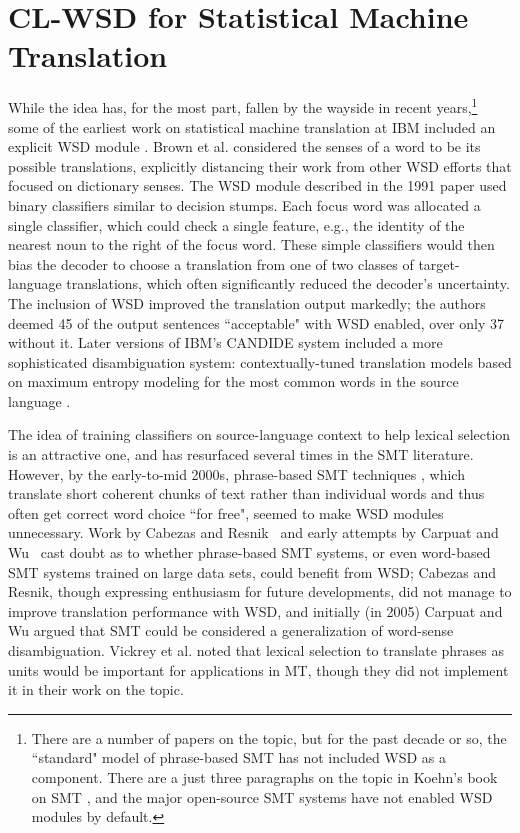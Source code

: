 \section{CL-WSD for Statistical Machine Translation}
While the idea has, for the most part, fallen by the wayside in recent
years,\footnote{There are a number of papers on the topic, but for the past
decade or so, the ``standard" model of phrase-based SMT has not included WSD as
a component. There are a just three paragraphs on the topic in Koehn's book on
SMT \cite[\S 5.3.6]{koehn2010statistical}, and the major open-source SMT
systems have not enabled WSD modules by default.}
some of the earliest work on statistical machine translation at IBM included
an explicit WSD module \cite{Brown91word-sensedisambiguation}.
Brown et al. considered the senses of a word to be its possible translations,
explicitly distancing their work from other WSD efforts that focused on
dictionary senses.
The WSD module described in the 1991 paper used binary classifiers similar to
decision stumps. Each focus word was allocated a single classifier, which could
check a single feature, e.g., the identity of the nearest noun to the right of
the focus word.
These simple classifiers would then bias the decoder to choose a
translation from one of two classes of target-language translations,
which often significantly reduced the decoder's uncertainty. The inclusion of
WSD improved the translation output markedly; the authors deemed 45 of the
output sentences ``acceptable" with WSD enabled, over only 37 without it.
Later versions of IBM's CANDIDE system included a more sophisticated
disambiguation system: contextually-tuned translation models based on
maximum entropy modeling for the most common words in the source language
\cite{Berger:1994:CSM:1075812.1075844}.

The idea of training classifiers on source-language context to help lexical
selection is an attractive one, and has resurfaced several times in the SMT
literature. However, by the early-to-mid 2000s, phrase-based SMT techniques
\cite{koehn2003statistical}, which translate short coherent chunks of text
rather than individual words and thus often get correct word choice ``for
free", seemed to make WSD modules unnecessary.
Work by Cabezas and
Resnik~\cite{cabezas2005using} and early attempts by Carpuat and
Wu~\cite{carpuat-wu:2005:ACL} cast doubt as to whether phrase-based SMT
systems, or even word-based SMT systems trained on large data sets, could
benefit from WSD; Cabezas and Resnik, though expressing enthusiasm for future
developments, did not manage to improve translation performance with WSD, and
initially (in 2005) Carpuat and Wu argued that SMT could be considered a
generalization of word-sense disambiguation. Vickrey et al.
\cite{vickrey-EtAl:2005:HLTEMNLP} noted that lexical selection to translate
phrases as units would be important for applications in MT, though they did not
implement it in their work on the topic.

